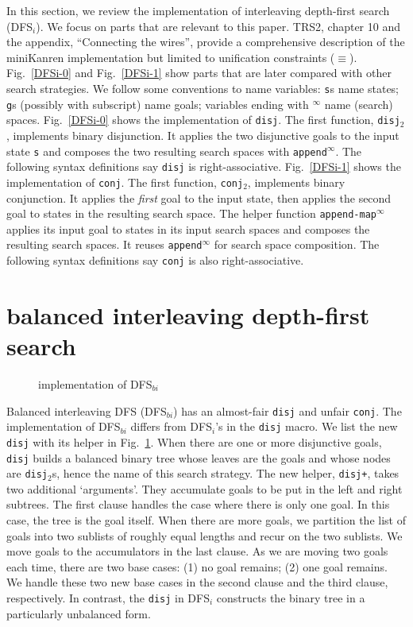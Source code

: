 \documentclass[format=acmlarge, review=true, authordraft=true]{acmart}
\newcommand{\conj}{\texttt{conj}}
\newcommand{\disj}{\texttt{disj}}
\newcommand{\disjtwo}{\texttt{disj$_2$}}
\newcommand{\conjtwo}{\texttt{conj$_2$}}
\newcommand{\DFSi }[0]{DFS$_{i}$}
\newcommand{\DFSbi}[0]{DFS$_{bi}$}
\begin{document}
In this section, we review the implementation of interleaving depth-first 
search (\DFSi). We focus on parts that are relevant to this paper. TRS2,
chapter 10 and the appendix, ``Connecting the wires'', 
provide a comprehensive description of the 
miniKanren 
implementation but limited to unification constraints ($\equiv$).
Fig.~\ref{DFSi-0} and Fig.~\ref{DFSi-1} show parts that are later compared 
with other search 
strategies. We follow some conventions to name variables: \texttt{s}s name 
states; \texttt{g}s (possibly with subscript) name goals; 
variables ending with $^\infty$ name (search) spaces. Fig.~\ref{DFSi-0} shows the 
implementation of \disj. The 
first function, \disjtwo, implements binary disjunction. It applies the 
two disjunctive goals to the input state \texttt{s} and composes the two 
resulting search spaces with \texttt{append$^\infty$}. The following syntax 
definitions say \disj{} is right-associative. Fig.~\ref{DFSi-1} 
shows the implementation of \conj. The first function, \conjtwo{}, 
implements binary conjunction. 
It applies the \emph{first} goal to the input state, then applies the second 
goal to states in the resulting search space. The helper function 
\texttt{append-map$^\infty$} applies its input goal to states 
in its input search spaces and composes the resulting search spaces. It reuses 
\texttt{append$^\infty$} for search space composition. The following syntax 
definitions say \conj{} is also right-associative.

\section{balanced interleaving depth-first search}

\begin{figure}
	
	\caption{implementation of \DFSbi{}}
	\label{balanced-disj}
\end{figure}

Balanced interleaving DFS (\DFSbi{}) has an almost-fair \disj{} and unfair 
\conj{}. The implementation of \DFSbi{} differs from 
\DFSi{}'s in the \disj{} macro. We list the new \disj{} with its 
helper in Fig.~\ref{balanced-disj}. When there are one or more disjunctive 
goals, \disj{} builds a balanced binary tree whose leaves are the goals and 
whose nodes are \disjtwo{}s, hence the name of this search strategy. 
The new helper, \texttt{disj+}, takes two additional `arguments'. They 
accumulate goals to be put in the left and right subtrees. The first clause 
handles the case where there is only one goal. In this case, the tree is the 
goal itself. When there are more goals, we partition the list of goals 
into two sublists of roughly equal lengths and recur on the two sublists. We 
move goals to the accumulators in the last clause. As we are moving 
two goals each time, there are two base cases: (1) no goal remains; (2) one 
goal remains. We handle these two new base cases in the second clause and the 
third clause, respectively. In contrast, the \disj{} in \DFSi{} constructs the 
binary tree in a particularly unbalanced form.
\end{document}
